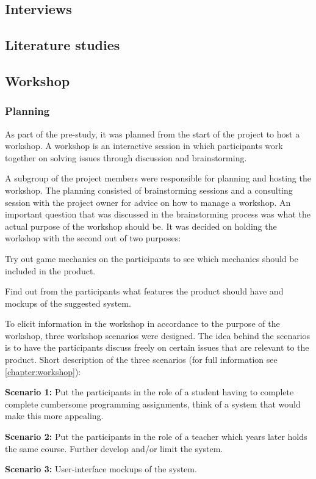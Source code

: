 \subsection{Interviews}

\subsection{Literature studies}

\subsection{Workshop}
\subsubsection{Planning}
As part of the pre-study, it was planned from the start of the project to host a workshop. A workshop is an interactive session in which participants work together on solving issues through discussion and brainstorming\cite{workshop}. 

A subgroup of the project members were responsible for planning and hosting the workshop. The planning consisted of brainstorming sessions and a consulting session with the project owner for advice on how to manage a workshop. An important question that was discussed in the brainstorming process was what the actual purpose of the workshop should be. It was decided on holding the workshop with the second out of two purposes:

\begin{list_type}  
    \item Try out game mechanics on the participants to see which mechanics should be included in the product.
    \item Find out from the participants what features the product should have and mockups of the suggested system. 
\end{list_type}

To elicit information in the workshop in accordance to the purpose of the workshop, three workshop scenarios were designed. The idea behind the scenarios is to have the participants discuss freely on certain issues that are relevant to the product. Short description of the three scenarios (for full information see \ref{chapter:workshop}):

\begin{list_type}  
    \item \textbf{Scenario 1:} Put the participants in the role of a student having to complete complete cumbersome programming assignments, think of a system that would make this more appealing.
    \item \textbf{Scenario 2:} Put the participants in the role of a teacher which years later holds the same course. Further develop and/or limit the system.
    \item \textbf{Scenario 3:} User-interface mockups of the system.
\end{list_type}
    
